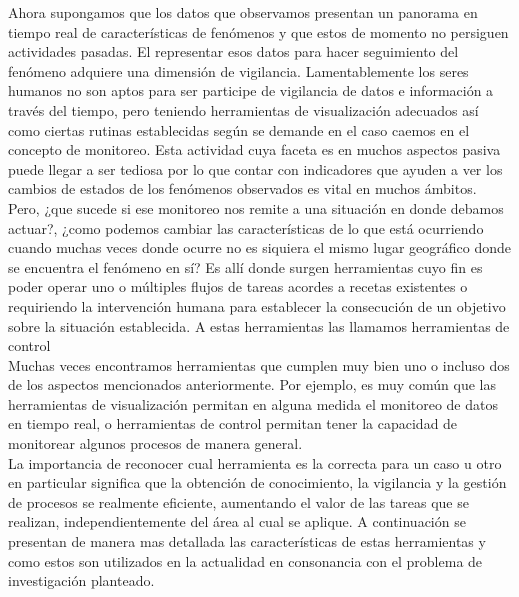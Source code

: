 Ahora supongamos que los datos que observamos presentan un panorama en tiempo real de características de fenómenos y que estos de momento no persiguen actividades pasadas. El representar esos datos para hacer seguimiento del fenómeno adquiere una dimensión de vigilancia. Lamentablemente los seres humanos no son aptos para ser participe de vigilancia de datos e información a través del tiempo, pero teniendo herramientas de visualización adecuados así como ciertas rutinas establecidas según se demande en el caso caemos en el concepto de monitoreo. Esta actividad cuya faceta es en muchos aspectos pasiva puede llegar a ser tediosa por lo que contar con indicadores que ayuden a ver los cambios de estados de los fenómenos observados es vital en muchos ámbitos.\\

Pero, ¿que sucede si ese monitoreo nos remite a una situación en donde debamos actuar?, ¿como podemos cambiar las características de lo que está ocurriendo cuando muchas veces donde ocurre no es siquiera el mismo lugar geográfico donde se encuentra el fenómeno en sí? Es allí donde surgen herramientas cuyo fin es poder operar uno o múltiples flujos de tareas acordes a recetas existentes o requiriendo la intervención humana para establecer la consecución de un objetivo sobre la situación establecida. A estas herramientas las llamamos herramientas de control\\

Muchas veces encontramos herramientas que cumplen muy bien uno o incluso dos de los aspectos mencionados anteriormente. Por ejemplo, es muy común que las herramientas de visualización permitan en alguna medida el monitoreo de datos en tiempo real, o herramientas de control permitan tener la capacidad de monitorear algunos procesos de manera general.\\

La importancia de reconocer cual herramienta es la correcta para un caso u otro en particular significa que la obtención de conocimiento, la vigilancia y la gestión de procesos se realmente eficiente, aumentando el valor de las tareas que se realizan, independientemente del área al cual se aplique. A continuación se presentan de manera mas detallada las características de estas herramientas y como estos son utilizados en la actualidad en consonancia con el problema de investigación planteado.

